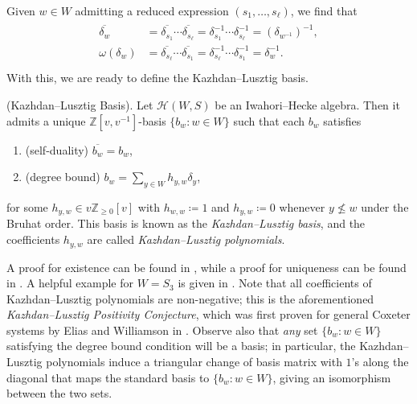 \noindent \noindent Given $w \in W$ admitting a reduced expression $(s_1, \dots, s_\ell)$, we find that
\begin{align*}
\begin{split}
\overline{\delta_w} &= \overline{\delta_{s_1}}\cdots\overline{\delta_{s_\ell}} = \delta_{s_1}^{-1}\cdots \delta_{s_\ell}^{-1} = (\delta_{w^{-1}})^{-1},\\
\omega(\delta_w) &= \overline{\delta_{s_\ell}}\cdots\overline{\delta_{s_1}} = \delta_{s_\ell}^{-1}\cdots \delta_{s_1}^{-1} = \delta_w^{-1}.\\
\end{split}
\end{align*}
\noindent With this, we are ready to define the Kazhdan--Lusztig basis.\\

\noindent\begin{theoremdefinition}\textup{(Kazhdan--Lusztig Basis).} Let $\mathscr{H}(W, S)$ be an Iwahori--Hecke algebra. Then it admits a unique $\mathbb{Z}[v, v^{-1}]$-basis $\{b_w : w \in W\}$ such that each $b_w$ satisfies
\begin{enumerate}[label=$\bullet$, leftmargin=4\parindent]
\item (self-duality) $\overline{b_w} = b_w$,
\item (degree bound) $b_w = \sum_{y \in W}{h_{y,w} \delta_y}$,
\end{enumerate}
\noindent for some $h_{y,w} \in v\mathbb{Z}_{\geq 0}[v]$ with $h_{w,w} \coloneqq 1$ and $h_{y,w} \coloneqq 0$ whenever $y \nleq w$ under the Bruhat order. This basis is known as the {\em Kazhdan--Lusztig basis}, and the coefficients $h_{y,w}$ are called {\em Kazhdan--Lusztig polynomials}.\\
\end{theoremdefinition}

\noindent A proof for existence can be found in \cite[Theorem 3.25]{EMTW20}, while a proof for uniqueness can be found in \cite[Lemma 3.10]{EMTW20}. A helpful example for $W = S_3$ is given in \cite[\S 3.3.1]{EMTW20}. Note that all coefficients of Kazhdan--Lusztig polynomials are non-negative; this is the aforementioned {\em Kazhdan--Lusztig Positivity Conjecture}, which was first proven for general Coxeter systems by Elias and Williamson in \cite[Corollary 1.2]{EW14}. Observe also that {\em any} set $\{b_w : w \in W\}$ satisfying the degree bound condition will be a basis; in particular, the Kazhdan--Lusztig polynomials induce a triangular change of basis matrix with $1$'s along the diagonal that maps the standard basis to $\{b_w : w \in W\}$, giving an isomorphism between the two sets.\\

